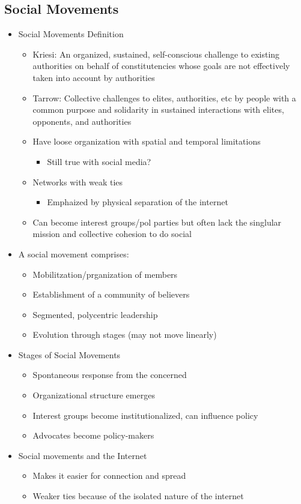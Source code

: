 \documentclass[11pt]{article}
\begin{document}
\subsection{Social Movements}
\label{sec:org129d173}
\begin{itemize}
\item Social Movements Definition
\begin{itemize}
\item Kriesi: An organized, sustained, self-conscious challenge to existing authorities on behalf of constitutencies whose goals are not effectively taken into account by authorities
\item Tarrow: Collective challenges to elites, authorities, etc by people with a common purpose and solidarity in sustained interactions with elites, opponents, and authorities
\item Have loose organization with spatial and temporal limitations
\begin{itemize}
\item Still true with social media?
\end{itemize}
\item Networks with weak ties
\begin{itemize}
\item Emphaized by physical separation of the internet
\end{itemize}
\item Can become interest groups/pol parties but often lack the singlular mission and collective cohesion to do social
\end{itemize}
\item A social movement comprises:
\begin{itemize}
\item Mobilitzation/prganization of members
\item Establishment of a community of believers
\item Segmented, polycentric leadership
\item Evolution through stages (may not move linearly)
\end{itemize}
\item Stages of Social Movements
\begin{itemize}
\item Spontaneous response from the concerned
\item Organizational structure emerges
\item Interest groups become institutionalized, can influence policy
\item Advocates become policy-makers
\end{itemize}
\item Social movements and the Internet
\begin{itemize}
\item Makes it easier for connection and spread
\item Weaker ties because of the isolated nature of the internet
\end{itemize}
\end{itemize}
\end{document}
